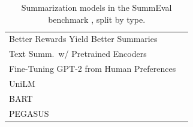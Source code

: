 \begin{table}[h]
\begin{tabular}{p{}l}
Better Rewards Yield Better Summaries    & \citeyear{bohm2019better}             \\
Text Summ.\ w/ Pretrained Encoders       & \citeyear{Liu2019TextSW}                \\
Fine-Tuning GPT-2 from Human Preferences & \citeyear{ziegler2019fine}            \\
UniLM                                    & \citeyear{dong2019unified}            \\
BART                                     & \citeyear{lewis2020bart}              \\
PEGASUS                                  & \citeyear{zhang2020pegasus}           \\
\bottomrule
\end{tabular}
\caption{Summarization models in the SummEval benchmark
         \citeyear{fabbri2021summeval}, split by type.}
\label{tab:summeval_models}
\end{table}
